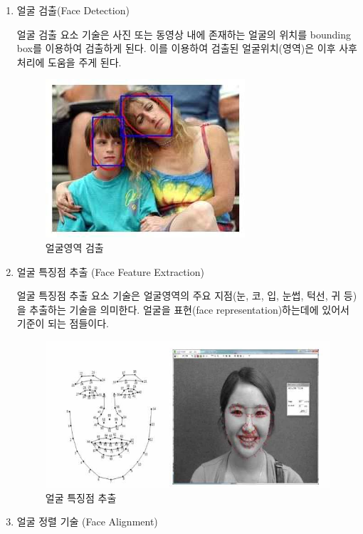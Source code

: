 \documentclass[chapter,oneside]{oblivoir}
\begin{document}
                        
\begin{enumerate}%
    \item  얼굴 검출(Face Detection)

    얼굴 검출 요소 기술은 사진 또는 동영상 내에 존재하는 얼굴의 위치를 bounding box를 이용하여 검출하게 된다. 이를 이용하여 검출된 얼굴위치(영역)은 이후 사후처리에 도움을 주게 된다.

    \begin{figure}[h!]
        \centering
        \includegraphics{pic/chp1/img398}
        \caption{얼굴영역 검출\cite{reference1}}
    \end{figure}
            
    \item 얼굴 특징점 추출 (Face Feature Extraction)

    얼굴 특징점 추출 요소 기술은 얼굴영역의 주요 지점(눈, 코, 입, 눈썹, 턱선, 귀 등)을 추출하는 기술을 의미한다. 얼굴을 표현(face representation)하는데에 있어서 기준이 되는 점들이다.
    \begin{figure}[h!]
        \centering
        \includegraphics{pic/chp1/img399}
        \caption{얼굴 특징점 추출\cite{reference2}}
    \end{figure}

    \item 얼굴 정렬 기술 (Face Alignment)


\end{enumerate}
\end{document}
